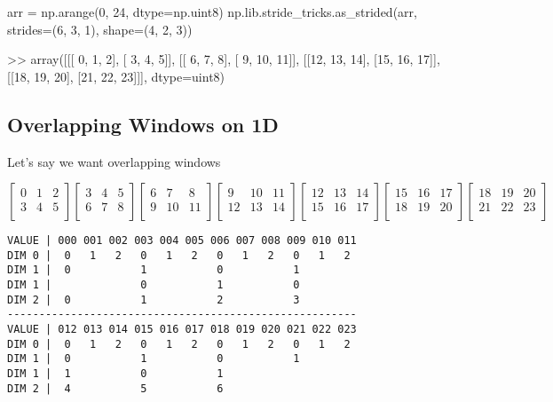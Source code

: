 \documentclass[oneside, 12pt]{report}
\begin{document}
\begin{python}
arr = np.arange(0, 24, dtype=np.uint8)
np.lib.stride_tricks.as_strided(arr, strides=(6, 3, 1), shape=(4, 2, 3))

>> array([[[ 0,  1,  2],
           [ 3,  4,  5]],
          [[ 6,  7,  8],
           [ 9, 10, 11]],
          [[12, 13, 14],
           [15, 16, 17]],
          [[18, 19, 20],
           [21, 22, 23]]], dtype=uint8)
\end{python}

\newpage

\subsection{Overlapping Windows on 1D}

Let's say we want overlapping windows

\begin{equation*}
\begin{bmatrix}
0 & 1 & 2 \\
3 & 4 & 5 \\
\end{bmatrix}
\begin{bmatrix}
3 & 4 & 5 \\
6 & 7 & 8 \\
\end{bmatrix}
\begin{bmatrix}
6 & 7 & 8 \\
9 & 10 & 11 \\
\end{bmatrix}
\begin{bmatrix}
9 & 10 & 11 \\
12 & 13 & 14 \\
\end{bmatrix}
\begin{bmatrix}
12 & 13 & 14 \\
15 & 16 & 17 \\
\end{bmatrix}
\begin{bmatrix}
15 & 16 & 17 \\
18 & 19 & 20 \\
\end{bmatrix}
\begin{bmatrix}
18 & 19 & 20 \\
21 & 22 & 23 \\
\end{bmatrix}
\end{equation*}

\begin{verbatim}
VALUE | 000 001 002 003 004 005 006 007 008 009 010 011 
DIM 0 |  0   1   2   0   1   2   0   1   2   0   1   2
DIM 1 |  0           1           0           1        
DIM 1 |              0           1           0
DIM 2 |  0           1           2           3                    
-------------------------------------------------------
VALUE | 012 013 014 015 016 017 018 019 020 021 022 023 
DIM 0 |  0   1   2   0   1   2   0   1   2   0   1   2
DIM 1 |  0           1           0           1        
DIM 1 |  1           0           1           
DIM 2 |  4           5           6                                
\end{verbatim}
\end{document}
